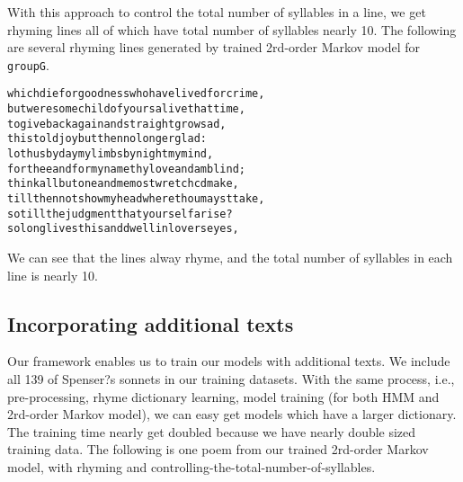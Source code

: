 With this approach to control the total number of syllables in a line, we get rhyming lines all of which have total number of syllables nearly 10. The following are several rhyming lines generated by trained 2rd-order Markov model for \texttt{groupG}.
\begin{alltt}
 which die for goodness who have lived for crime,
 but were some child of yours alive that time,
 to give back again and straight grow sad,
 this told joy but then no longer glad:
 lo thus by day my limbs by night my mind,
 for thee and for my name thy love and am blind;
 think all but one and me most wretchcd make,
 till then not show my head where thou mayst take, 
 so till the judgment that your self arise?
 so long lives this and dwell in lovers eyes, 
\end{alltt}
We can see that the lines alway rhyme, and the total number of syllables in each line is nearly 10.


\subsection{Incorporating additional texts}
Our framework enables us to train our models with additional texts. We include all 139 of Spenser?s sonnets in our training datasets. With the same process, i.e., pre-processing, rhyme dictionary learning, model training (for both HMM and 2rd-order Markov model), we can easy get models which have a larger dictionary. The training time nearly get doubled because we have nearly double sized training data. The following is one poem from our trained 2rd-order Markov model, with rhyming and controlling-the-total-number-of-syllables.



